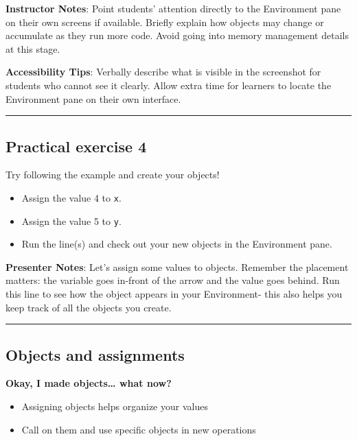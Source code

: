 \documentclass[
  letterpaper,
  DIV=11,
  numbers=noendperiod]{scrartcl}
\providecommand{\tightlist}{%
  \setlength{\itemsep}{0pt}\setlength{\parskip}{0pt}}
\begin{document}
\textbf{Instructor Notes}: Point students' attention directly to the
Environment pane on their own screens if available. Briefly explain how
objects may change or accumulate as they run more code. Avoid going into
memory management details at this stage.

\textbf{Accessibility Tips}: Verbally describe what is visible in the
screenshot for students who cannot see it clearly. Allow extra time for
learners to locate the Environment pane on their own interface.

\begin{center}\rule{0.5\linewidth}{0.5pt}\end{center}

\subsection{Practical exercise 4}\label{practical-exercise-4}

Try following the example and create your objects!

\begin{itemize}
\tightlist
\item[$\square$]
  Assign the value 4 to \texttt{x}.
\item[$\square$]
  Assign the value 5 to \texttt{y}.
\item[$\square$]
  Run the line(s) and check out your new objects in the Environment
  pane.
\end{itemize}

\textbf{Presenter Notes}: Let's assign some values to objects. Remember
the placement matters: the variable goes in-front of the arrow and the
value goes behind. Run this line to see how the object appears in your
Environment- this also helps you keep track of all the objects you
create.

\begin{center}\rule{0.5\linewidth}{0.5pt}\end{center}

\subsection{Objects and assignments}\label{objects-and-assignments}

\textbf{Okay, I made objects\ldots{} what now?}

\begin{itemize}
\tightlist
\item
  Assigning objects helps organize your values
\item
  Call on them and use specific objects in new operations
\end{itemize}
\end{document}

